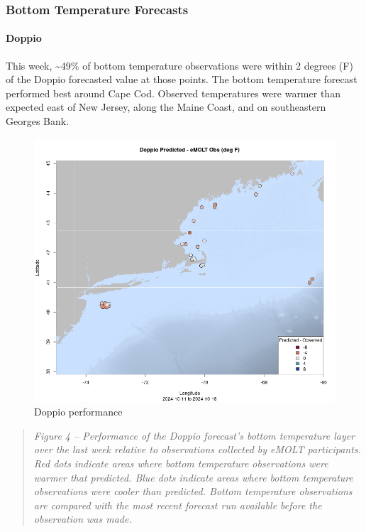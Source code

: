 \documentclass[
]{article}
\begin{document}
\hypertarget{bottom-temperature-forecasts}{%
\subsubsection{Bottom Temperature
Forecasts}\label{bottom-temperature-forecasts}}

\hypertarget{doppio}{%
\paragraph{Doppio}\label{doppio}}

This week, \textasciitilde49\% of bottom temperature observations were
within 2 degrees (F) of the Doppio forecasted value at those points. The
bottom temperature forecast performed best around Cape Cod. Observed
temperatures were warmer than expected east of New Jersey, along the
Maine Coast, and on southeastern Georges Bank.

\begin{figure}
\centering
\includegraphics{doppio_compare.png}
\caption{Doppio performance}
\end{figure}

\begin{quote}
\emph{Figure 4 -- Performance of the Doppio forecast's bottom
temperature layer over the last week relative to observations collected
by eMOLT participants. Red dots indicate areas where bottom temperature
observations were warmer that predicted. Blue dots indicate areas where
bottom temperature observations were cooler than predicted. Bottom
temperature observations are compared with the most recent forecast run
available before the observation was made.}
\end{quote}
\end{document}
